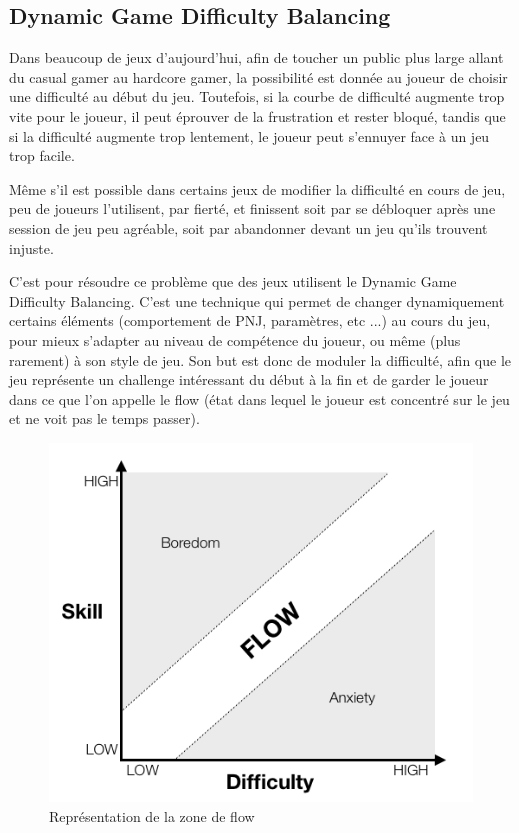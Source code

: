 \documentclass[a4paper, 12pt]{article} %
\begin{document}
\newpage
\subsection{Dynamic Game Difficulty Balancing}

Dans beaucoup de jeux d’aujourd’hui, afin de toucher un public plus large allant du casual gamer au hardcore gamer, la possibilité est donnée au joueur de choisir une difficulté au début du jeu. Toutefois, si la courbe de difficulté augmente trop vite pour le joueur, il peut éprouver de la frustration et rester bloqué, tandis que si la difficulté augmente trop lentement, le joueur peut s’ennuyer face à un jeu trop facile.

Même s’il est possible dans certains jeux de modifier la difficulté en cours de jeu, peu de joueurs l’utilisent, par fierté, et finissent soit par se débloquer après une session de jeu peu agréable, soit par abandonner devant un jeu qu’ils trouvent injuste.

C’est pour résoudre ce problème que des jeux utilisent le Dynamic Game Difficulty Balancing\cite{hunicke2005case}. C’est une technique qui permet de changer dynamiquement certains éléments (comportement de PNJ, paramètres, etc ...) au cours du jeu, pour mieux s’adapter au niveau de compétence du joueur, ou même (plus rarement) à son style de jeu. Son but est donc de moduler la difficulté, afin que le jeu représente un challenge intéressant du début à la fin et de garder le joueur dans ce que l'on appelle le flow (état dans lequel le joueur est concentré sur le jeu et ne voit pas le temps passer).

\begin{figure}[!h]%
	\begin{center} 
		\includegraphics[width=0.60\columnwidth]{images/flow.png}%
		\caption{Représentation de la zone de flow}%
	\end{center}
\end{figure}
\end{document}
